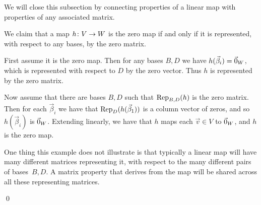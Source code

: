 \documentclass[10pt,t,serif,professionalfont]{beamer}
\begin{document}
\begin{frame}
We will close this subsection by connecting properties of a linear map
with properties of any associated matrix.

\ex
We claim that a map $\map{h}{V}{W}$ is the zero map if and only
if it is represented, with respect to any bases, by the zero matrix.

\pause
First assume it is the zero map.
Then for any bases $B,D$ we have $h(\vec{\beta}_i)=\zero_W$, which is 
represented with respect to $D$ by the zero vector.
Thus $h$ is represented by the zero matrix.

\pause
Now assume that there are bases $B,D$ such that $\rep{h}{B,D}$ is the zero
matrix.
Then for each $\vec{\beta}_i$ we have that $\rep{h(\vec{\beta}_1)}{D}$ is a
column vector of zeros, and so $h(\vec{\beta}_i)$ is $\zero_W$.
Extending linearly, we have that $h$ maps each $\vec{v}\in V$ to $\zero_W$,
and $h$ is the zero map.  

\pause
\medskip
One thing this example does not illustrate is that typically a linear map
will have many different matrices representing it, with respect to 
the many different pairs of bases~$B,D$.
A matrix property that derives from the map will be shared across
all these representing matrices. 
\end{frame}




\begin{frame}
\th[th:RankMatEqRankMap]
\pause
\pf
{}

\pause
{}
\end{frame}
\begin{frame}
\qed
\end{frame}
\end{document}
